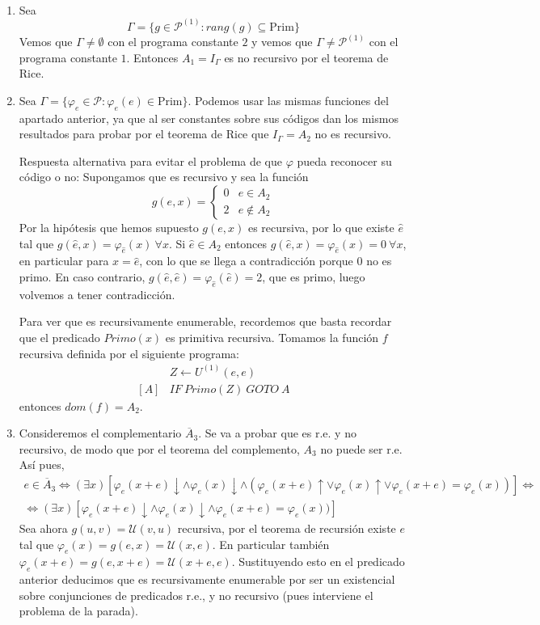 \documentclass[11pt]{article}
\let \sii \Leftrightarrow
\begin{document}
\begin{solucion}\
\begin{enumerate}
	\item Sea
	\[  Γ = \{g \in \mathcal{P}^{(1)} : rang(g) \subseteq \text{Prim}\} \]
	Vemos que $Γ \neq \emptyset$ con el programa constante $2$ y vemos que $Γ \neq \mathcal{P}^{(1)}$ con el programa constante $1$. Entonces $A_1 = I_Γ$ es no recursivo por el teorema de Rice.
	
	\item Sea $\Gamma=\{ \varphi_e\in\mathcal{P}: \varphi_e(e)\in$Prim$\}$. Podemos usar las mismas funciones del apartado anterior, ya que al ser constantes sobre sus códigos dan los mismos resultados para probar por el teorema de Rice que $I_{\Gamma}=A_2$ no es recursivo.
	
	Respuesta alternativa para evitar el problema de que $\varphi$ pueda reconocer su código o no:
	Supongamos que es recursivo y sea la función 
	\[
	g(e,x)=\begin{cases}
	0 & e\in A_2\\
	2 & e\notin A_2
	\end{cases}
	\]
	Por la hipótesis que hemos supuesto $g(e,x)$ es recursiva, por lo que existe $\hat{e}$ tal que $g(\hat{e},x)=\varphi_{\hat{e}}(x)\ \forall x$. Si $\hat{e}\in A_2$ entonces $g(\hat{e},x)=\varphi_{\hat{e}}(x)=0\ \forall x$, en particular para $x=\hat{e}$, con lo que se llega a contradicción porque 0 no es primo. En caso contrario, $g(\hat{e},\hat{e})=\varphi_{\hat{e}}(\hat{e})=2$, que es primo, luego volvemos a tener contradicción.
	
	Para ver que es recursivamente enumerable, recordemos que basta recordar que el predicado $Primo(x)$ es primitiva recursiva. Tomamos la función $f$ recursiva definida por el siguiente programa:
	\begin{align*}
& Z \leftarrow U^{(1)}(e,e)\\
[A] & IF\ Primo(Z)\ GOTO\ A
\end{align*}
	entonces $dom(f) = A_2$.

	\item Consideremos el complementario $\overline{A}_3$. Se va a probar que es r.e. y no recursivo, de modo que por el teorema del complemento, $A_3$ no puede ser r.e. Así pues, 
\begin{gather*}
e\in\overline{A}_3\sii (\exists x)[\varphi_e(x+e)\downarrow\land\varphi_e(x)\downarrow\land(\varphi_e(x+e)\uparrow\lor\varphi_e(x)\uparrow\lor \varphi_e(x+e)=\varphi_e(x))]\sii\\
\sii (\exists x)[\varphi_e(x+e)\downarrow\land\varphi_e(x)\downarrow\land\varphi_e(x+e)=\varphi_e(x))]
\end{gather*}
Sea ahora $g(u,v)=\mathcal{U}(v,u)$ recursiva, por el teorema de recursión existe $e$ tal que $\varphi_e(x)=g(e,x)=\mathcal{U}(x,e)$. En particular también $\varphi_e(x+e)=g(e,x+e)=\mathcal{U}(x+e,e)$. Sustituyendo esto en el predicado anterior deducimos que es recursivamente enumerable por ser un existencial sobre conjunciones de predicados r.e., y no recursivo (pues interviene el problema de la parada).
\end{enumerate}
\end{solucion}
\end{document}
